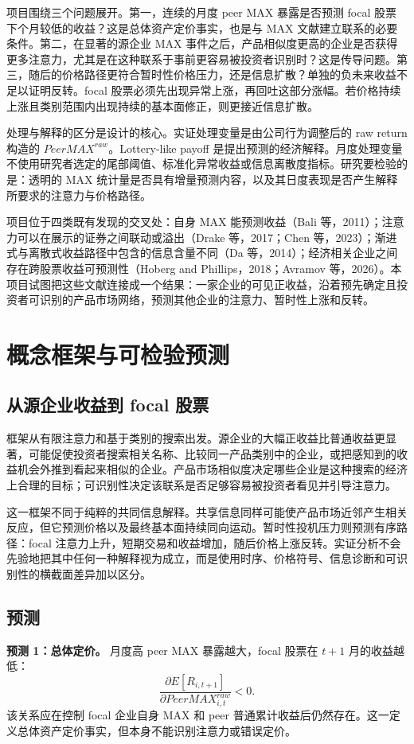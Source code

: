 \documentclass[UTF8,a4paper,11pt]{ctexart}
\begin{document}
项目围绕三个问题展开。第一，连续的月度 peer MAX 暴露是否预测 focal 股票下个月较低的收益？这是总体资产定价事实，也是与 MAX 文献建立联系的必要条件。第二，在显著的源企业 MAX 事件之后，产品相似度更高的企业是否获得更多注意力，尤其是在这种联系于事前更容易被投资者识别时？这是传导问题。第三，随后的价格路径更符合暂时性价格压力，还是信息扩散？单独的负未来收益不足以证明反转。focal 股票必须先出现异常上涨，再回吐这部分涨幅。若价格持续上涨且类别范围内出现持续的基本面修正，则更接近信息扩散。

处理与解释的区分是设计的核心。实证处理变量是由公司行为调整后的 raw return 构造的 $PeerMAX^{raw}$。Lottery-like payoff 是提出预测的经济解释。月度处理变量不使用研究者选定的尾部阈值、标准化异常收益或信息离散度指标。研究要检验的是：透明的 MAX 统计量是否具有增量预测内容，以及其日度表现是否产生解释所要求的注意力与价格路径。

项目位于四类既有发现的交叉处：自身 MAX 能预测收益（Bali 等，2011）；注意力可以在展示的证券之间联动或溢出（Drake 等，2017；Chen 等，2023）；渐进式与离散式收益路径中包含的信息含量不同（Da 等，2014）；经济相关企业之间存在跨股票收益可预测性（Hoberg and Phillips，2018；Avramov 等，2026）。本项目试图把这些文献连接成一个结果：一家企业的可见正收益，沿着预先确定且投资者可识别的产品市场网络，预测其他企业的注意力、暂时性上涨和反转。

\section{概念框架与可检验预测}
\subsection{从源企业收益到 focal 股票}
框架从有限注意力和基于类别的搜索出发。源企业的大幅正收益比普通收益更显著，可能促使投资者搜索相关名称、比较同一产品类别中的企业，或把感知到的收益机会外推到看起来相似的企业。产品市场相似度决定哪些企业是这种搜索的经济上合理的目标；可识别性决定该联系是否足够容易被投资者看见并引导注意力。

这一框架不同于纯粹的共同信息解释。共享信息同样可能使产品市场近邻产生相关反应，但它预测价格以及最终基本面持续同向运动。暂时性投机压力则预测有序路径：focal 注意力上升，短期交易和收益增加，随后价格上涨反转。实证分析不会先验地把其中任何一种解释视为成立，而是使用时序、价格符号、信息诊断和可识别性的横截面差异加以区分。

\subsection{预测}
\textbf{预测 1：总体定价。} 月度高 peer MAX 暴露越大，focal 股票在 $t+1$ 月的收益越低：
\[
\frac{\partial E[R_{i,t+1}]}{\partial PeerMAX^{raw}_{i,t}}<0.
\]
该关系应在控制 focal 企业自身 MAX 和 peer 普通累计收益后仍然存在。这一定义总体资产定价事实，但本身不能识别注意力或错误定价。
\end{document}
